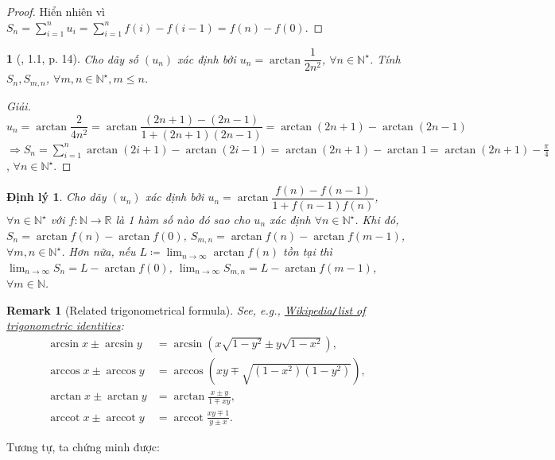 \documentclass{article}
\newtheorem{baitoan}{}
\newtheorem{dinhly}{Định lý}
\newtheorem{remark}{Remark}
\begin{document}
\begin{proof}
	Hiển nhiên vì $S_n = \sum_{i=1}^n u_i = \sum_{i=1}^n f(i) - f(i - 1) = f(n) - f(0)$.
\end{proof}

\begin{baitoan}[\cite{Quoc_Long_Dat_Nam_VMC}, 1.1, p. 14]
	Cho dãy số $(u_n)$ xác định bởi $u_n = \arctan\dfrac{1}{2n^2}$, $\forall n\in\mathbb{N}^\star$. Tính $S_n,S_{m,n}$, $\forall m,n\in\mathbb{N}^\star,m\le n$.
\end{baitoan}

\begin{proof}[Giải]
	$u_n = \arctan\dfrac{2}{4n^2} = \arctan\dfrac{(2n + 1) - (2n - 1)}{1 + (2n + 1)(2n - 1)} = \arctan(2n + 1) - \arctan(2n - 1)$ $\Rightarrow S_n = \sum_{i=1}^n \arctan(2i + 1) - \arctan(2i - 1) = \arctan(2n + 1) - \arctan1 = \arctan(2n + 1) - \frac{\pi}{4}$, $\forall n\in\mathbb{N}^\star$.
\end{proof}

\begin{dinhly}
	Cho dãy $(u_n)$ xác định bởi $u_n = \arctan\dfrac{f(n) - f(n - 1)}{1 + f(n - 1)f(n)}$, $\forall n\in\mathbb{N}^\star$ với $f:\mathbb{N}\to\mathbb{R}$ là 1 hàm số nào đó sao cho $u_n$ xác định $\forall n\in\mathbb{N}^\star$. Khi đó, $S_n = \arctan f(n) - \arctan f(0)$, $S_{m,n} = \arctan f(n) - \arctan f(m - 1)$, $\forall m,n\in\mathbb{N}^\star$. Hơn nữa, nếu $L\coloneqq\lim_{n\to\infty} \arctan f(n)$ tồn tại thì $\lim_{n\to\infty} S_n = L - \arctan f(0)$, $\lim_{n\to\infty} S_{m,n} = L - \arctan f(m - 1)$, $\forall m\in\mathbb{N}$.
\end{dinhly}

\begin{remark}[Related trigonometrical formula]
	See, e.g., \href{https://en.wikipedia.org/wiki/List_of_trigonometric_identities}{Wikipedia{\tt/}list of trigonometric identities}:
	\begin{align*}
		\arcsin x\pm\arcsin y &= \arcsin(x\sqrt{1 - y^2}\pm y\sqrt{1 - x^2}),\\
		\arccos x\pm\arccos y &= \arccos\left(xy\mp\sqrt{(1 - x^2)(1 - y^2)}\right),\\
		\arctan x\pm\arctan y &= \arctan\frac{x\pm y}{1\mp xy},\\
		\operatorname{arccot}x\pm\operatorname{arccot}y &= \operatorname{arccot}\frac{xy\mp1}{y\pm x}.
	\end{align*}
\end{remark}
Tương tự, ta chứng minh được:
\end{document}
